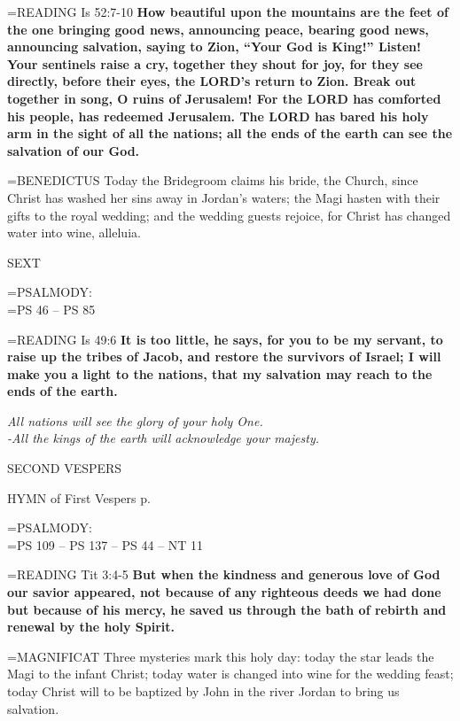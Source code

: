 \hangindent=\parindent \small{READING}    Is 52:7-10 \textbf{    How beautiful upon the mountains are the feet of the one bringing good news, announcing peace, bearing good news, announcing salvation, saying to Zion, “Your God is King!” Listen! Your sentinels raise a cry, together they shout for joy, for they see directly, before their eyes, the LORD’s return to Zion. Break out together in song, O ruins of Jerusalem! For the LORD has comforted his people, has redeemed Jerusalem. The LORD has bared his holy arm in the sight of all the nations; all the ends of the earth can see the salvation of our God.\\}

\hangindent=\parindent \small{BENEDICTUS 	Today the Bridegroom claims his bride, the Church, since Christ has washed her sins away in Jordan's waters; the Magi hasten with their gifts to the royal wedding; and the wedding guests rejoice, for Christ has changed water into wine, alleluia.\\}

\begin{flushleft}\normalsize SEXT\\\end{flushleft}

\hangindent=\parindent \small{PSALMODY:}\\
\hangindent=\parindent  PS 46 -- PS 85\vspace{0.5em}

\hangindent=\parindent \small{READING}    Is 49:6 \textbf{    It is too little, he says, for you to be my servant, to raise up the tribes of Jacob, and restore the survivors of Israel; I will make you a light to the nations, that my salvation may reach to the ends of the earth.}

\begin{center}
\textit{All nations will see the glory of your holy One.\\
-All the kings of the earth will acknowledge your majesty.}
\end{center}

\begin{flushleft}\normalsize SECOND VESPERS\\\end{flushleft}

HYMN of First Vespers p. \pageref{epiphany:hymn}

\hangindent=\parindent \small{PSALMODY:}\\
\hangindent=\parindent  PS 109 -- PS 137 -- PS 44 -- NT 11\vspace{0.5em}

\hangindent=\parindent \small{READING}    Tit 3:4-5 \textbf{    But when the kindness and generous love of God our savior appeared, not because of any righteous deeds we had done but because of his mercy, he saved us through the bath of rebirth and renewal by the holy Spirit.\\}

\hangindent=\parindent \small{MAGNIFICAT 	Three mysteries mark this holy day: today the star leads the Magi to the infant Christ; today water is changed into wine for the wedding feast; today Christ will to be baptized by John in the river Jordan to bring us salvation.\\}
